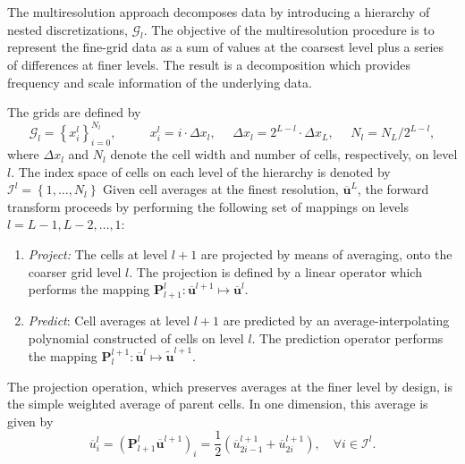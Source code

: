 \documentclass[]{article}
\begin{document}
    The multiresolution approach decomposes data by introducing a hierarchy
    of nested discretizations, $\bm{\mathcal{G}}_{l}$. The objective of the
    multiresolution procedure is to represent the fine-grid data as a sum of
    values at the coarsest level plus a series of differences at finer levels.
    The result is a decomposition which provides frequency and scale
    information of the underlying data.

    The grids are defined by
    \begin{equation}
        \bm{\mathcal{G}}_{l} = \left\{ x_{i}^{l} \right\}_{i=0}^{N_{l}}, \text{ }
        \text{ } \text{ } \text{ } x_{i}^{l} = i \cdot \Delta x_{l}, \text{ }
        \text{ } \Delta x_{l} = 2^{L-l} \cdot \Delta x_{L}, \text{ } \text{ } N_{l} = N_{L}
        / 2^{L-l},
    \end{equation}
    where $\Delta x_{l}$ and $N_{l}$ denote the cell width and number of cells,
    respectively, on level $l$. The index space of cells on each level of the
    hierarchy is denoted by $\bm{\mathcal{I}}^{l} = \left\{ 1,\dots,N_{l}
    \right\}$ Given cell averages at the finest resolution,
    $\bm{\overline{u}}^{L}$, the forward transform proceeds by performing the
    following set of mappings on levels $l = L-1,L-2,\dots,1$:
    \begin{enumerate}
        \item[] \textit{Project:} The cells at level $l+1$ are projected
            by means of averaging, onto the coarser grid
            level $l$. The projection is defined by a linear operator
            which performs the mapping $\bm{P}_{l+1}^{l} : \overline{\bm{u}}^{l+1}
            \mapsto \overline{\bm{u}}^{l}$.
        \item[] \textit{Predict}: Cell averages at level $l+1$
            are predicted by an average-interpolating polynomial constructed
            of cells on level $l$. The prediction operator performs
            the mapping $\bm{P}_{l}^{l+1} : \overline{\bm{u}}^{l} \mapsto
            \tilde{\bm{u}}^{l+1}$.
    \end{enumerate}
    The projection operation, which preserves averages at the finer level
    by design, is the simple weighted average of parent cells.  In one
    dimension, this average is given by
    \begin{equation}
        \overline{u}^{l}_{i} = \left( \bm{P}_{l+1}^{l}
        \overline{\bm{u}}^{l+1} \right)_{i} = \frac{1}{2} (
        \overline{u}^{l+1}_{2i-1} + \overline{u}^{l+1}_{2i} ), \quad \forall
        i \in \bm{\mathcal{I}}^{l}.
    \end{equation}
\end{document}
